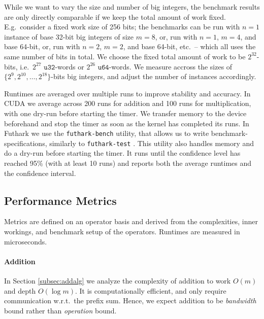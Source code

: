 While we want to vary the size and number of big integers, the benchmark results
are only directly comparable if we keep the total amount of work fixed. E.g.\
consider a fixed work size of 256 bits; the benchmarks can be run with $n=1$
instance of base 32-bit big integers of size $m=8$, or, run with $n=1$, $m=4$,
and base 64-bit, or, run with $n=2$, $m=2$, and base 64-bit, etc.\ -- which all
uses the same number of bits in total. We choose the fixed total amount of work
to be $2^{32}$-bits, i.e.\ $2^{27}$ $\mathtt{u32}$-words or $2^{26}$
$\mathtt{u64}$-words. We measure accross the sizes of
$\{2^9,2^{10},\ldots,2^{18}\}$-bits big integers, and adjust the number of instances
accordingly.

Runtimes are averaged over multiple runs to improve stability and accuracy. In
CUDA we average across 200 runs for addition and 100 runs for multiplication,
with one dry-run before starting the timer. We transfer memory to the device
beforehand and stop the timer as soon as the kernel has completed its runs. In
Futhark we use the \texttt{futhark-bench} utility, that allows us to write
benchmark-specifications, similarly to \texttt{futhark-test}
\cite{futguide}. This utility also handles memory and do a dry-run before
starting the timer. It runs until the confidence level has reached 95\% (with at
least 10 runs) and reports both the average runtimes and the confidence
interval.

\subsection{Performance Metrics}
\label{subsec:perfmet}

Metrics are defined on an operator basis and derived from the complexities,
inner workings, and benchmark setup of the operators. Runtimes are measured in
microseconds.

\paragraph{Addition}
In Section \ref{subsec:addalg} we analyze the complexity of addition to work
$O(m)$ and depth $O(\log m)$. It is computationally efficient, and only require
communication w.r.t.\ the prefix sum. Hence, we expect addition to be
\textit{bandwidth} bound rather than \textit{operation} bound.

